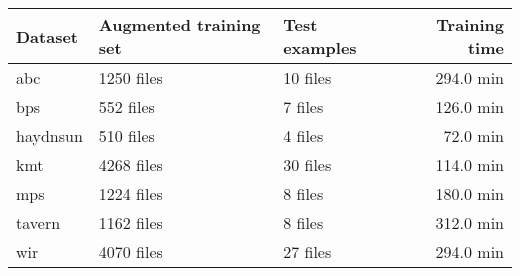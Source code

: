 \begin{tabular}{l|llr}
Dataset        & Augmented training set & Test examples & Training time \\ \hline
\gls{abc}      & 1250  files                 & 10 files           & 294.0 min         \\
\gls{bps}      & 552   files                 & 7  files           & 126.0 min         \\
\gls{haydnsun} & 510   files                 & 4  files           & 72.0 min         \\
\gls{kmt}      & 4268  files                 & 30 files           & 114.0 min         \\
\gls{mps}      & 1224  files                 & 8  files           & 180.0 min         \\
\gls{tavern}   & 1162  files                 & 8  files           & 312.0 min         \\
\gls{wir}      & 4070  files                 & 27 files           & 294.0 min        
\end{tabular}







